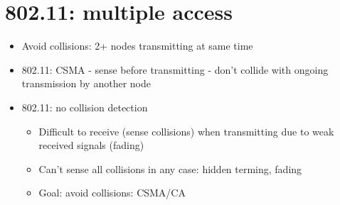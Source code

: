 \documentclass{article}[18pt]
\begin{document}
\section{802.11: multiple access}
\begin{itemize}
	\item Avoid collisions: 2+ nodes transmitting at same time
	\item 802.11: CSMA - sense before transmitting - don't collide with ongoing transmission by another node
	\item 802.11: no collision detection
	\begin{itemize}
		\item Difficult to receive (sense collisions) when transmitting due to weak received signals (fading)
		\item Can't sense all collisions in any case: hidden terming, fading
		\item Goal: avoid collisions: CSMA/CA
	\end{itemize}
\end{itemize}
\end{document}
